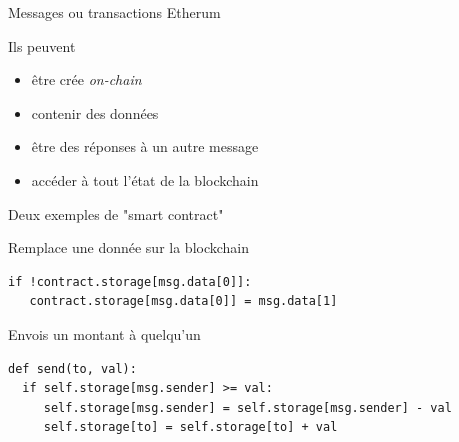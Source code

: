 \documentclass[presentation]{beamer}
\begin{document}
\begin{frame}[label={sec:org5296c83}]{Messages ou transactions Etherum}
\begin{block}{Ils peuvent}
\begin{itemize}
\item être crée \emph{on-chain}
\item contenir des données
\item être des réponses à un autre message
\item accéder à tout l'état de la blockchain
\end{itemize}
\end{block}
\end{frame}

\begin{frame}[label={sec:org84ae2f5},fragile]{Deux exemples de "smart contract"}
 \begin{block}{Remplace une donnée sur la blockchain}
\begin{verbatim}
if !contract.storage[msg.data[0]]:
   contract.storage[msg.data[0]] = msg.data[1]
\end{verbatim}
\end{block}

\begin{block}{Envois un montant à quelqu'un}
\begin{verbatim}
def send(to, val):
  if self.storage[msg.sender] >= val:
     self.storage[msg.sender] = self.storage[msg.sender] - val
     self.storage[to] = self.storage[to] + val
\end{verbatim}
\end{block}
\end{frame}
\end{document}
